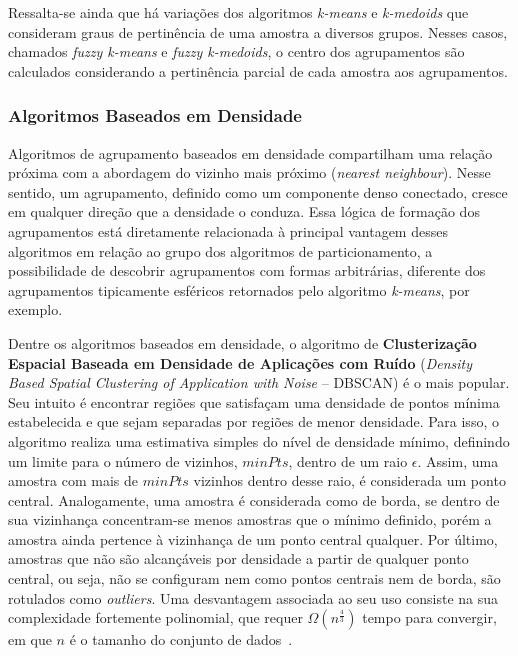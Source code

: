 \documentclass{SBCbookchapter}
\begin{document}
Ressalta-se ainda que há variações dos algoritmos \textit{k-means} e \textit{k-medoids} que consideram graus de pertinência de uma amostra a diversos grupos. Nesses casos, chamados \textit{fuzzy k-means} e \textit{fuzzy k-medoids}, o centro dos agrupamentos são calculados considerando a pertinência parcial de cada amostra aos agrupamentos.

\subsubsection{Algoritmos Baseados em Densidade}
\label{subsubsec:densidade}

Algoritmos de agrupamento baseados em densidade compartilham uma relação próxima com a abordagem do vizinho mais próximo (\textit{nearest neighbour}). Nesse sentido, um agrupamento, definido como um componente denso conectado, cresce em qualquer direção que a densidade o conduza. Essa lógica de formação dos agrupamentos está diretamente relacionada à principal vantagem desses algoritmos em relação ao grupo dos algoritmos de particionamento, a possibilidade de descobrir agrupamentos com formas arbitrárias, diferente dos agrupamentos tipicamente esféricos retornados pelo algoritmo \textit{k-means}, por exemplo.

Dentre os algoritmos baseados em densidade, o algoritmo de \textbf{Clusterização Espacial Baseada em Densidade de Aplicações com Ruído} (\textit{Density Based Spatial Clustering of Application with Noise} -- DBSCAN) é o mais popular. Seu intuito é encontrar regiões que satisfaçam uma densidade de pontos mínima estabelecida e que sejam separadas por regiões de menor densidade. Para isso, o algoritmo realiza uma estimativa simples do nível de densidade mínimo, definindo um limite para o número de vizinhos, $minPts$, dentro de um raio $\epsilon$. Assim, uma amostra 
com mais de $minPts$ vizinhos dentro desse raio, é considerada um ponto central. Analogamente, uma amostra é considerada como de borda, se dentro de sua vizinhança concentram-se menos amostras que o mínimo definido, porém a amostra ainda pertence à vizinhança de um ponto central qualquer. Por último, amostras que não são alcançáveis por densidade a partir de qualquer ponto central, ou seja, não se configuram nem como pontos centrais nem de borda, são rotulados como \textit{outliers}. Uma desvantagem associada ao seu uso consiste na sua complexidade fortemente polinomial, que requer $\Omega (n^{\frac {4}{3}})$ tempo para convergir, em que $ n $ é o tamanho do conjunto de dados~\cite{fahad2014survey, gan2015dbscan, schubert2017dbscan}.
\end{document}
